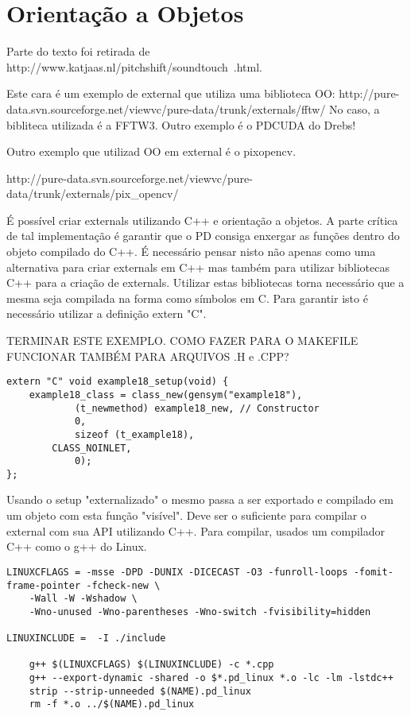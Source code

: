 
\chapter{Orientação a Objetos}

Parte do texto foi retirada de http://www.katjaas.nl/pitchshift/soundtouch~.html.

Este cara é um exemplo de external que utiliza uma biblioteca OO:
http://pure-data.svn.sourceforge.net/viewvc/pure-data/trunk/externals/fftw/
No caso, a bibliteca utilizada é a FFTW3. Outro exemplo é o PDCUDA do Drebs!

Outro exemplo que utilizad OO em external é o pixopencv.

http://pure-data.svn.sourceforge.net/viewvc/pure-data/trunk/externals/pix\_opencv/

É possível criar externals utilizando C++ e orientação a objetos. A parte crítica de tal implementação é garantir que o PD consiga enxergar as funções dentro do objeto compilado do C++. É necessário pensar nisto não apenas como uma alternativa para criar externals em C++ mas também para utilizar bibliotecas C++ para a criação de externals. Utilizar estas bibliotecas torna necessário que a mesma seja compilada na forma como símbolos em C. Para garantir isto é necessário utilizar a definição extern "C".

TERMINAR ESTE EXEMPLO. COMO FAZER PARA O MAKEFILE FUNCIONAR TAMBÉM PARA ARQUIVOS .H e .CPP?


\begin{lstlisting}
extern "C" void example18_setup(void) {
    example18_class = class_new(gensym("example18"),
            (t_newmethod) example18_new, // Constructor
            0,
            sizeof (t_example18),
	    CLASS_NOINLET,
            0);
};
\end{lstlisting}

Usando o setup "externalizado" o mesmo passa a ser exportado e compilado em um objeto com esta função "visível". Deve ser o suficiente para compilar o external com sua API utilizando C++. Para compilar, usados um compilador C++ como o g++ do Linux.

\begin{lstlisting}
LINUXCFLAGS = -msse -DPD -DUNIX -DICECAST -O3 -funroll-loops -fomit-frame-pointer -fcheck-new \
    -Wall -W -Wshadow \
    -Wno-unused -Wno-parentheses -Wno-switch -fvisibility=hidden

LINUXINCLUDE =  -I ./include

	g++ $(LINUXCFLAGS) $(LINUXINCLUDE) -c *.cpp 
	g++ --export-dynamic -shared -o $*.pd_linux *.o -lc -lm -lstdc++ 
	strip --strip-unneeded $(NAME).pd_linux
	rm -f *.o ../$(NAME).pd_linux
\end{lstlisting}



